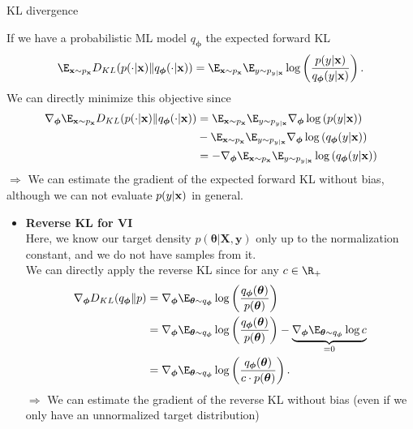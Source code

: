 \documentclass[11pt,compress,t,notes=noshow, xcolor=table]{beamer}
\begin{document}
\begin{vbframe}{KL divergence}
\begin{itemize}
    If we have a probabilistic ML model $q_{\bm{\phi}}$ the  expected forward KL
    $$\E_{\xv \sim p_{\xv}}D_{KL}(p(\cdot|\xv) \| q_{\bm{\phi}}(\cdot|\xv)) = \E_{\xv \sim p_{\xv}}\E_{y \sim p_{y|\xv}}\log\left(\frac{p(y|\xv)}{q_{\bm{\phi}}(y|\xv)}\right).$$
We can directly minimize this objective since 
\begin{align*}
         \nabla_{\bm{\phi}} \E_{\xv \sim p_{\xv}}D_{KL}(p(\cdot|\xv) \| q_{\bm{\phi}}(\cdot|\xv)) &=  \E_{\xv \sim p_{\xv}}\E_{y \sim p_{y|\xv}}\nabla_{\bm{\phi}}\log\left(
         p(y|\xv)\right) \\
         &- \E_{\xv \sim p_{\xv}}\E_{y \sim p_{y|\xv}}\nabla_{\bm{\phi}}\log\left(q_{\bm{\phi}}(y|\xv)\right) \\
         &= -\nabla_{\bm{\phi}} \E_{\xv \sim p_{\xv}}\E_{y \sim p_{y|\xv}}\log\left(q_{\bm{\phi}}(y|\xv)\right)
     \end{align*}
     $\Rightarrow$ We can estimate the gradient of the expected forward KL without bias, although we can not evaluate $p(y\vert \mathbf{x})$ in general. 
\end{itemize}
 \framebreak

 \begin{itemize}
     \item \textbf{Reverse KL for VI} \\
     Here, we know our target density $p(\bm{\theta}\vert \mathbf{X}, \mathbf{y})$ only up to the normalization constant, and we do not have samples from it. \\
     \lz
     We can directly apply the reverse KL since for any $c\in \R_+$
     \begin{align*}
         \nabla_{\bm{\phi}} D_{KL}(q_{\bm{\phi}}\|p) &= \nabla_{\bm{\phi}} \E_{\bm{\theta} \sim q_{\bm{\phi}}}\log\left(\frac{q_{\bm{\phi}}(\bm{\theta})}{p(\bm{\theta})}\right) \\
         &= \nabla_{\bm{\phi}} \E_{\bm{\theta} \sim q_{\bm{\phi}}}\log\left(\frac{q_{\bm{\phi}}(\bm{\theta})}{p(\bm{\theta})}\right) - \underbrace{\nabla_{\bm{\phi}} \E_{\bm{\theta} \sim q_{\bm{\phi}}}\log c}_{=0}\\
         &= \nabla_{\bm{\phi}} \E_{\bm{\theta} \sim q_{\bm{\phi}}}\log\left(\frac{q_{\bm{\phi}}(\bm{\theta})}{c\cdot p(\bm{\theta})}\right).
     \end{align*}
     $\Rightarrow$ We can estimate the gradient of the reverse KL without bias (even if we only have an unnormalized target distribution)
 \end{itemize}
 \framebreak


\end{vbframe}
\end{document}
